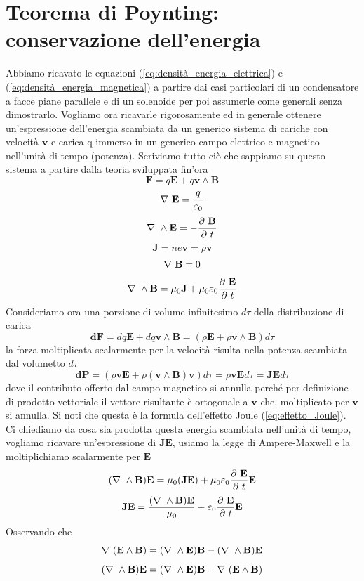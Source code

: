 \documentclass[
10pt, %
a4paper, %
oneside, %
headinclude,footinclude, %
BCOR5mm, %
]{scrartcl}
\begin{document}
\section{Teorema di Poynting: conservazione dell'energia}
Abbiamo ricavato le equazioni (\ref{eq:densità_energia_elettrica}) e (\ref{eq:densità_energia_magnetica}) a partire dai casi particolari di un condensatore a facce piane parallele e di un solenoide per poi assumerle come generali senza dimostrarlo. Vogliamo ora ricavarle rigorosamente ed in generale ottenere un'espressione dell'energia scambiata da un generico sistema di cariche con velocità \(\mathbf{v}\) e carica q immerso in un generico campo elettrico e magnetico nell'unità di tempo (potenza). Scriviamo tutto ciò che sappiamo su questo sistema a partire dalla teoria sviluppata fin'ora
\[\mathbf{F} = q\mathbf{E}+q\mathbf{v}\wedge\mathbf{B}\]
\[\nabla\ \mathbf{E} = \frac{q}{\varepsilon_0}\]
\[\nabla\ \wedge\mathbf{E} = -\frac{\partial\  \mathbf{B}}{\partial\  t}\]
\[\mathbf{J} = n e \mathbf{v} = \rho \mathbf{v}\]
\[\nabla\ \mathbf{B} = 0\]
\[\nabla\ \wedge\mathbf{B} = \mu_0\mathbf{J}+\mu_0\varepsilon_0\frac{\partial\ \mathbf{E}}{\partial\  t}\]
Consideriamo ora una porzione di volume infinitesimo \(d\tau\) della distribuzione di carica
\[\mathbf{dF} = dq\mathbf{E} + dq\mathbf{v}\wedge\mathbf{B} = (\rho\mathbf{E} + \rho \mathbf{v}\wedge\mathbf{B})d\tau\]
la forza moltiplicata scalarmente per la velocità risulta nella potenza scambiata dal volumetto $d\tau$
\[\mathbf{dP} = (\rho\mathbf{v}\mathbf{E} + \rho (\mathbf{v}\wedge\mathbf{B})\mathbf{v})d\tau =  \rho\mathbf{v}\mathbf{E}d\tau = \mathbf{J}\mathbf{E}d\tau\]
dove il contributo offerto dal campo magnetico si annulla perché per definizione di prodotto vettoriale il vettore risultante è ortogonale a \(\mathbf{v}\) che, moltiplicato per \(\mathbf{v}\) si annulla. Si noti che questa è la formula dell'effetto Joule (\ref{eq:effetto_Joule}).\\
Ci chiediamo da cosa sia prodotta questa energia scambiata nell'unità di tempo, vogliamo ricavare un'espressione di \(\mathbf{J}\mathbf{E}\), usiamo la legge di Ampere-Maxwell e la moltiplichiamo scalarmente per \(\mathbf{E}\)
\[(\nabla\ \wedge\mathbf{B})\mathbf{E} = \mu_0(\mathbf{J}\mathbf{E}) + \mu_0\varepsilon_0 \frac{\partial\  \mathbf{E}}{\partial\  t}\mathbf{E}\]
\[\mathbf{J}\mathbf{E} = \frac{(\nabla\ \wedge\mathbf{B})\mathbf{E}}{\mu_0}-\varepsilon_0\frac{\partial\  \mathbf{E}}{\partial\  t}\mathbf{E}\]
Osservando che
\[\nabla\ (\mathbf{E}\wedge\mathbf{B}) = (\nabla\ \wedge\mathbf{E})\mathbf{B}-(\nabla\ \wedge\mathbf{B})\mathbf{E}\]
\[(\nabla\ \wedge\mathbf{B})\mathbf{E} = (\nabla\ \wedge\mathbf{E})\mathbf{B}- \nabla\ (\mathbf{E}\wedge\mathbf{B})\]
\end{document}
